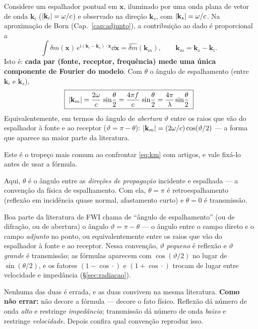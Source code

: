 \documentclass[11pt,a4paper,oneside]{report}
\begin{document}
\begin{derivacao}
Considere um espalhador pontual em $\mathbf{x}$, iluminado por uma onda plana
de vetor de onda $\mathbf{k}_i$ ($\lvert \mathbf{k}_i \rvert = \omega/c$) e observado
na dire\c{c}\~ao $\mathbf{k}_s$, com $\lvert \mathbf{k}_s \rvert = \omega/c$. Na
aproxima\c{c}\~ao de Born (Cap.~\ref{cap:adjunto}), a contribui\c{c}\~ao ao
dado \'e proporcional a
\[
\int \delta m(\mathbf{x})\,
e^{\mathrm{i}(\mathbf{k}_i - \mathbf{k}_s)\cdot\mathbf{x}}
\dd\mathbf{x}
 = \widehat{\delta m}(\mathbf{k}_m),
\qquad
\mathbf{k}_m = \mathbf{k}_s - \mathbf{k}_i .
\]
Isto \'e: \textbf{cada par (fonte, receptor, frequ\^encia) mede uma \'unica
componente de Fourier do modelo}. Com $\theta$ o \^angulo de espalhamento
(entre $\mathbf{k}_i$ e $\mathbf{k}_s$),
\begin{equation}
\boxed{\;
\lvert \mathbf{k}_m \rvert = \frac{2\omega}{c}\,\sin\!\frac{\theta}{2}
 = \frac{4\pi f}{c}\,\sin\!\frac{\theta}{2}
 = \frac{4\pi}{\lambda}\sin\!\frac{\theta}{2}\;}
\label{eq:km}
\end{equation}
Equivalentemente, em termos do \^angulo de \emph{abertura} $\vartheta$ entre os
raios que v\~ao do espalhador \`a fonte e ao receptor
($\vartheta = \pi - \theta$): $\lvert \mathbf{k}_m \rvert =
(2\omega/c)\cos(\vartheta/2)$ --- a forma que aparece na maior parte da
literatura.
\end{derivacao}

\begin{armadilha}
Este \'e o trope\c{c}o mais comum ao confrontar \eqref{eq:km} com artigos, e
vale fix\'a-lo antes de usar a f\'ormula.

Aqui, $\theta$ \'e o \^angulo entre as \emph{dire\c{c}\~oes de
propaga\c{c}\~ao} incidente e espalhada --- a conven\c{c}\~ao da f\'isica de
espalhamento. Com ela, $\theta = \pi$ \'e retroespalhamento (reflex\~ao em
incid\^encia quase normal, afastamento curto) e $\theta = 0$ \'e transmiss\~ao.

Boa parte da literatura de FWI chama de ``\^angulo de espalhamento'' (ou de
difra\c{c}\~ao, ou de abertura) o \^angulo $\vartheta = \pi - \theta$ --- o
\^angulo entre o campo direto e o campo \emph{adjunto} no ponto, ou
equivalentemente entre os raios que v\~ao do espalhador \`a fonte e ao
receptor. Nessa conven\c{c}\~ao, $\vartheta$ \emph{pequeno} \'e reflex\~ao e
$\vartheta$ \emph{grande} \'e transmiss\~ao; as f\'ormulas aparecem com
$\cos(\vartheta/2)$ no lugar de $\sin(\theta/2)$, e os fatores
$(1-\cos\cdot)$ e $(1+\cos\cdot)$ trocam de lugar entre velocidade e
imped\^ancia (§\ref{sec:radiacao}).

Nenhuma das duas \'e errada, e as duas convivem na mesma literatura.
\textbf{Como n\~ao errar:} n\~ao decore a f\'ormula --- decore o fato
f\'isico. Reflex\~ao d\'a n\'umero de onda \emph{alto} e restringe
\emph{imped\^ancia}; transmiss\~ao d\'a n\'umero de onda \emph{baixo} e
restringe \emph{velocidade}. Depois confira qual conven\c{c}\~ao reproduz
isso.
\end{armadilha}
\end{document}
